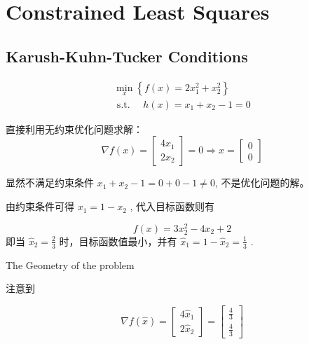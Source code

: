 \chapter{Constrained Least Squares}

\section{Karush-Kuhn-Tucker Conditions}

\begin{problem}
    \begin{equation}
\begin{array}{l}
\min _{x}\left\{f(x)=2 x_{1}^{2}+x_{2}^{2}\right\} \\
\text { s.t. } \quad h(x)=x_{1}+x_{2}-1=0
\end{array}
\end{equation}

直接利用无约束优化问题求解： 
\begin{equation} \nabla f(x)=\left[\begin{array}{l}4 x_{1} \\ 2 x_{2}\end{array}\right]=0 \Rightarrow x=\left[\begin{array}{l}0 \\ 0\end{array}\right] \end{equation}

显然不满足约束条件 $ x_{1}+x_{2}-1=0+0-1 \neq 0 $, 不是优化问题的解。
\end{problem}

由约束条件可得 $ x_{1}=1-x_{2} $ , 代入目标函数则有

\begin{equation} f(x)=3 x_{2}^{2}-4 x_{2}+2 \end{equation}
即当 $ \hat{x}_{2}=\frac{2}{3} $ 时，目标函数值最小，并有 $ \hat{x}_{1}=1-\hat{x}_{2}=\frac{1}{3} $ .

\begin{FigureCenter}{The Geometry of the problem}
    \label{fig:geometry-of-the-problem}
    
\end{FigureCenter}

注意到

\begin{equation} \nabla f(\hat{x})=\left[\begin{array}{l}4 \hat{x}_{1} \\ 2 \hat{x}_{2}\end{array}\right]=\left[\begin{array}{l}\frac{4}{3} \\ \frac{4}{3}\end{array}\right] \end{equation}

